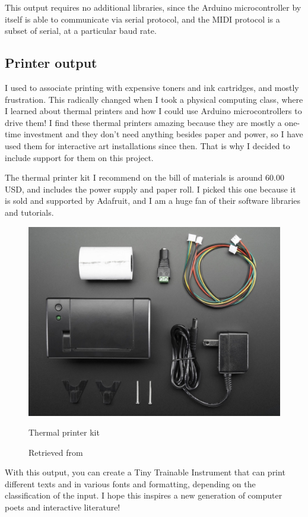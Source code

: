This output requires no additional libraries, since the Arduino microcontroller by itself is able to communicate via serial protocol, and the MIDI protocol is a subset of serial, at a particular baud rate.

\subsection{Printer output}

I used to associate printing with expensive toners and ink cartridges, and mostly frustration. This radically changed when I took a physical computing class, where I learned about thermal printers and how I could use Arduino microcontrollers to drive them! I find these thermal printers amazing because they are mostly a one-time investment and they don't need anything besides paper and power, so I have used them for interactive art installations since then. That is why I decided to include support for them on this project.

The thermal printer kit I recommend on the bill of materials is around 60.00 USD, and includes the power supply and paper roll. I picked this one because it is sold and supported by Adafruit, and I am a huge fan of their software libraries and tutorials. 

\begin{figure}[ht]
  \centering
  \includegraphics[width=0.75\linewidth,height=0.25\textheight,keepaspectratio]{images/materials-adafruit-thermal-printer.jpg}
  \caption{Thermal printer kit}
  \caption*{Retrieved from \cite{website-materials-adafruit-thermal-printer}}
  \label{fig:materials-adafruit-thermal-printer}
\end{figure}

With this output, you can create a Tiny Trainable Instrument that can print different texts and in various fonts and formatting, depending on the classification of the input. I hope this inspires a new generation of computer poets and interactive literature!

